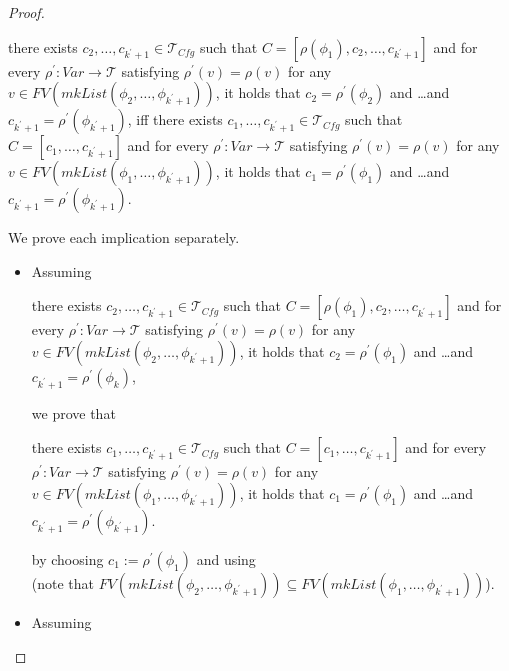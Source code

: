 \documentclass{article}
\newcommand{\Tcfg}{\mathcal{T}_{\mathit{Cfg}}}
\newenvironment{proofenv}
  {
    \VerbatimEnvironment\begin{tcolorbox}[colback=black!0!white] %
  }
  {
   \end{tcolorbox}
  }
\begin{document}
\begin{proof}
\begin{itemize}
    \begin{proofenv}
    there exists $c_2, \ldots, c_{k^\prime + 1} \in \Tcfg$ such that
    $C = [\rho(\phi_1), c_2, \ldots, c_{k^\prime+1}]$
    and for every $\rho^\prime : \mathit{Var} \to \mathcal{T}$ satisfying
    $\rho^\prime(v) = \rho(v)$ for any
    $v \in \mathit{FV}(\mathit{mkList}(\phi_2, \ldots, \phi_{k^\prime+1}))$,
    it holds that
    $c_2 = \rho^\prime(\phi_2)$ and \ldots and $c_{k^\prime+1} = \rho^\prime(\phi_{k^\prime+1})$,
    iff there exists $c_1, \ldots, c_{k^\prime + 1} \in \Tcfg$ such that $C = [c_1, \ldots, c_{k^\prime + 1}]$
    and for every $\rho^\prime : \mathit{Var} \to \mathcal{T}$ satisfying
    $\rho^\prime(v) = \rho(v)$ for any
    $v \in \mathit{FV}(\mathit{mkList}(\phi_1, \ldots, \phi_{k^\prime + 1}))$,
    it holds that
    $c_1 = \rho^\prime(\phi_1)$ and \ldots and $c_{k^\prime + 1} = \rho^\prime(\phi_{k^\prime + 1})$.
    \end{proofenv}
    We prove each implication separately.
    \begin{itemize}
        \item Assuming
        \begin{proofenv}
        there exists $c_2, \ldots, c_{k^\prime + 1} \in \Tcfg$ such that
        $C = [\rho(\phi_1), c_2, \ldots, c_{k^\prime+1}]$
        and for every $\rho^\prime : \mathit{Var} \to \mathcal{T}$ satisfying
        $\rho^\prime(v) = \rho(v)$ for any
        $v \in \mathit{FV}(\mathit{mkList}(\phi_2, \ldots, \phi_{k^\prime+1}))$,
        it holds that
        $c_2 = \rho^\prime(\phi_1)$ and \ldots and $c_{k^\prime+1} = \rho^\prime(\phi_k)$,
        \end{proofenv}
        we prove that
        \begin{proofenv}
        there exists $c_1, \ldots, c_{k^\prime + 1} \in \Tcfg$ such that $C = [c_1, \ldots, c_{k^\prime + 1}]$
        and for every $\rho^\prime : \mathit{Var} \to \mathcal{T}$ satisfying
        $\rho^\prime(v) = \rho(v)$ for any
        $v \in \mathit{FV}(\mathit{mkList}(\phi_1, \ldots, \phi_{k^\prime + 1}))$,
        it holds that
        $c_1 = \rho^\prime(\phi_1)$ and \ldots and $c_{k^\prime + 1} = \rho^\prime(\phi_{k^\prime + 1})$.
        \end{proofenv}
        by choosing $c_1 := \rho^\prime(\phi_1)$ and using \\
        (note that $\mathit{FV}(\mathit{mkList}(\phi_2,\ldots,\phi_{k^\prime+1})) \subseteq \mathit{FV}(\mathit{mkList}(\phi_1,\ldots,\phi_{k^\prime+1}))$).
        \item Assuming

\end{itemize}
\end{itemize}
\end{proof}
\end{document}

